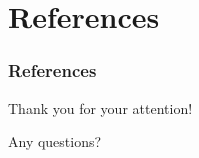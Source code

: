 
\section{References}

\begin{frame}
  \frametitle{References}
  \printbibliography %
\end{frame}



\begin{frame}
    \Large
    \begin{alertblock}{}
        \centering
        Thank you for your attention!

        Any questions?
    \end{alertblock}
\end{frame}


